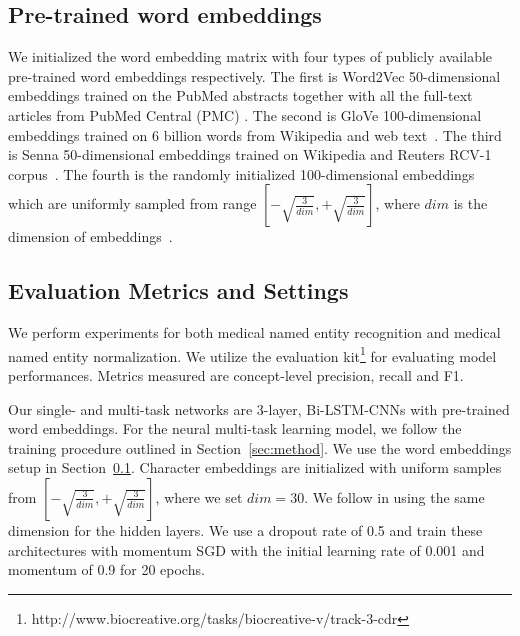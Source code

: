 \subsection{Pre-trained word embeddings}
\label{sec: embeddings}
We initialized the word embedding matrix with four types of publicly available pre-trained word embeddings respectively. 
The first is Word2Vec 50-dimensional embeddings trained on the PubMed abstracts together with all the full-text articles from PubMed Central (PMC) \cite{Pyysalo2013b}. The second is GloVe 100-dimensional embeddings trained on 6 billion words from Wikipedia and web text~\cite{pennington-socher-manning}. The third  is Senna 50-dimensional embeddings trained on Wikipedia and Reuters RCV-1 corpus~\cite{Collobert2011}. The fourth is the randomly initialized 100-dimensional embeddings which are uniformly sampled from range $[-\sqrt{\frac{3}{dim}},+\sqrt{\frac{3}{dim}}]$, where $dim$ is the dimension of embeddings~\cite{He:2015:DDR:2919332.2919814}.

\subsection{Evaluation Metrics and Settings} 
We perform experiments for both medical named entity recognition and medical named entity normalization.
We utilize the evaluation kit\footnote{http://www.biocreative.org/tasks/biocreative-v/track-3-cdr} for evaluating model performances. 
Metrics measured are %
concept-level precision, recall and F1.
  
Our single- and multi-task networks are 3-layer, Bi-LSTM-CNNs with pre-trained word embeddings. For the neural multi-task learning model, we follow the training procedure outlined in Section~\ref{sec:method}. We use the word embeddings setup in Section~\ref{sec: embeddings}. Character embeddings are initialized with uniform samples from
$[-\sqrt{\frac{3}{dim}},+\sqrt{\frac{3}{dim}}]$, where we set $dim = 30$. 
 We follow \cite{S2014Deep} in using the same dimension for the hidden layers. We use a dropout rate of 0.5 and train these architectures with momentum SGD with the initial learning rate of 0.001 and momentum of 0.9 for 20 epochs.

